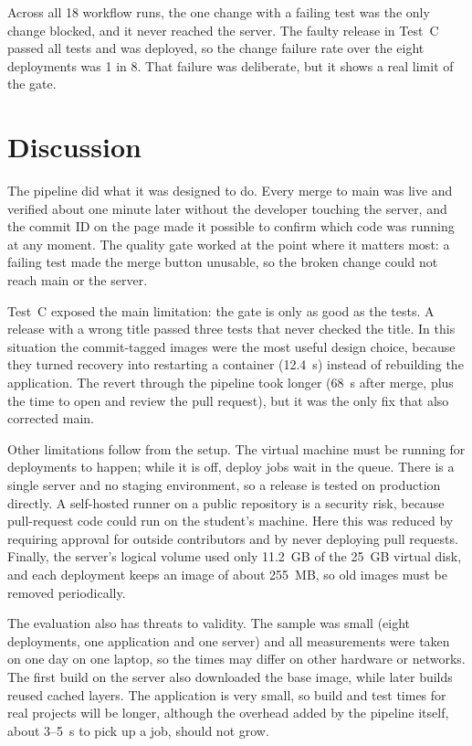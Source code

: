 \documentclass[conference]{IEEEtran}
\begin{document}
Across all 18 workflow runs, the one change with a failing test was the only change blocked, and it never reached the server. The faulty release in Test~C passed all tests and was deployed, so the change failure rate over the eight deployments was 1 in 8. That failure was deliberate, but it shows a real limit of the gate.

\section{Discussion}
The pipeline did what it was designed to do. Every merge to main was live and verified about one minute later without the developer touching the server, and the commit ID on the page made it possible to confirm which code was running at any moment. The quality gate worked at the point where it matters most: a failing test made the merge button unusable, so the broken change could not reach main or the server.

Test~C exposed the main limitation: the gate is only as good as the tests. A release with a wrong title passed three tests that never checked the title. In this situation the commit-tagged images were the most useful design choice, because they turned recovery into restarting a container (12.4~s) instead of rebuilding the application. The revert through the pipeline took longer (68~s after merge, plus the time to open and review the pull request), but it was the only fix that also corrected main.

Other limitations follow from the setup. The virtual machine must be running for deployments to happen; while it is off, deploy jobs wait in the queue. There is a single server and no staging environment, so a release is tested on production directly. A self-hosted runner on a public repository is a security risk, because pull-request code could run on the student's machine. Here this was reduced by requiring approval for outside contributors and by never deploying pull requests. Finally, the server's logical volume used only 11.2~GB of the 25~GB virtual disk, and each deployment keeps an image of about 255~MB, so old images must be removed periodically.

The evaluation also has threats to validity. The sample was small (eight deployments, one application and one server) and all measurements were taken on one day on one laptop, so the times may differ on other hardware or networks. The first build on the server also downloaded the base image, while later builds reused cached layers. The application is very small, so build and test times for real projects will be longer, although the overhead added by the pipeline itself, about 3--5~s to pick up a job, should not grow.
\end{document}
